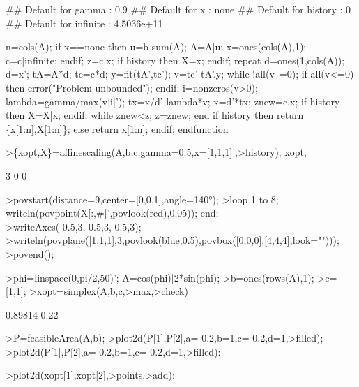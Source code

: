 \documentclass[a4paper,10pt]{article}
\begin{document}
\begin{eulernotebook}
\begin{eulercomment}
\begin{eulercomment}
\begin{euleroutput}
  ## Default for gamma : 0.9
  ## Default for x : none
  ## Default for history : 0
  ## Default for infinite : 4.5036e+11
  
      n=cols(A);
      if x==none then
          u=b-sum(A);
          A=A|u;
          x=ones(cols(A),1);
          c=c|infinite;
      endif;
      z=c.x;
      if history then X=x; endif;
      repeat
          d=ones(1,cols(A));
          d=x';
          tA=A*d; tc=c*d;
          y=fit(tA',tc');
          v=tc'-tA'.y;
          while !all(v~=0);
          if all(v<=0) then
              error("Problem unbounded");
          endif;
          i=nonzeros(v>0);
          lambda=gamma/max(v[i]');
          tx=x/d'-lambda*v;
          x=d'*tx;
          znew=c.x;
          if history then X=X|x; endif;
          while znew<z;
          z=znew;
      end
      if history then return \{x[1:n],X[1:n]\};
      else return x[1:n];
      endif;
  endfunction
\end{euleroutput}
\begin{eulerprompt}
>\{xopt,X\}=affinescaling(A,b,c,gamma=0.5,x=[1,1,1]',>history); xopt,
\end{eulerprompt}
\begin{euleroutput}
          3 
          0 
          0 
\end{euleroutput}
\begin{eulerprompt}
>povstart(distance=9,center=[0,0,1],angle=140°);
>loop 1 to 8; writeln(povpoint(X[:,#]',povlook(red),0.05)); end;
>writeAxes(-0.5,3,-0.5,3,-0.5,3);
>writeln(povplane([1,1,1],3,povlook(blue,0.5),povbox([0,0,0],[4,4,4],look="")));
>povend();
\end{eulerprompt}
\begin{eulerprompt}
>phi=linspace(0,pi/2,50)'; A=cos(phi)|2*sin(phi);
>b=ones(rows(A),1);
>c=[1,1];
>xopt=simplex(A,b,c,>max,>check)
\end{eulerprompt}
\begin{euleroutput}
    0.89814 
       0.22 
\end{euleroutput}
\begin{eulerprompt}
>P=feasibleArea(A,b);
>plot2d(P[1],P[2],a=-0.2,b=1,c=-0.2,d=1,>filled);
>plot2d(P[1],P[2],a=-0.2,b=1,c=-0.2,d=1,>filled):
\end{eulerprompt}
\begin{eulerprompt}
>plot2d(xopt[1],xopt[2],>points,>add):
\end{eulerprompt}

\end{eulercomment}
\end{eulercomment}
\end{eulernotebook}
\end{document}

